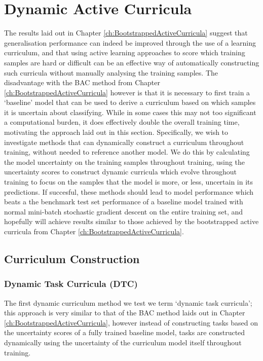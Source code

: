 \chapter{Dynamic Active Curricula}
The results laid out in Chapter \ref{ch:BootstrappedActiveCurricula} suggest that generalisation performance can indeed be improved through the use of a learning curriculum, and that using active learning approaches to score which training samples are hard or difficult can be an effective way of automatically constructing such curricula without manually analysing the training samples. The disadvantage with the BAC method from Chapter \ref{ch:BootstrappedActiveCurricula} however is that it is necessary to first train a `baseline' model that can be used to derive a curriculum based on which samples it is uncertain about classifying. While in some cases this may not too significant a computational burden, it does effectively double the overall training time, motivating the approach laid out in this section. Specifically, we wish to investigate methods that can dynamically construct a curriculum throughout training, without needed to reference another model. We do this by calculating the model uncertainty on the training samples throughout training, using the uncertainty scores to construct dynamic curricula which evolve throughout training to focus on the samples that the model is more, or less, uncertain in its predictions. If succesful, these methods should lead to model performance which beats a the benchmark test set performance of a baseline model trained with normal mini-batch stochastic gradient descent on the entire training set, and hopefully will achieve results similar to those achieved by the bootstrapped active curricula from Chapter \ref{ch:BootstrappedActiveCurricula}.
\section{Curriculum Construction}
\subsection{Dynamic Task Curricula (DTC)}
The first dynamic curriculum method we test we term `dynamic task curricula'; this approach is very similar to that of the BAC method laids out in Chapter \ref{ch:BootstrappedActiveCurricula}, however instead of constructing tasks based on the uncertainty scores of a fully trained baseline model, tasks are constructed dynamically using the uncertainty of the curriculum model itself throughout training. 

